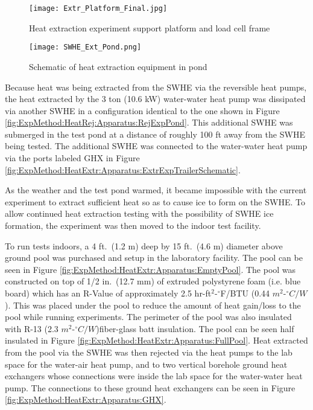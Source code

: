 	\begin{figure}
		\centering
		\texttt{[image: Extr\_Platform\_Final.jpg]}
		\caption[Final ice-on-coil platform]{Heat extraction experiment support platform and load cell frame}
		\label{fig:ExpMethod:HeatExtr:Apparatus:ExtrPlatformFinal}
	\end{figure}


	\begin{figure}
		\centering
		\texttt{[image: SWHE\_Ext\_Pond.png]}
		\caption[Schematic of heat extraction equipment in pond]{Schematic of heat extraction equipment in pond}
		\label{fig:ExpMethod:HeatExtr:Apparatus:ExtrExpPondSchematic}
	\end{figure}

Because heat was being extracted from the SWHE via the reversible heat pumps, the heat extracted by the 3 ton (10.6 kW) water-water heat pump was dissipated via another SWHE in a configuration identical to the one shown in Figure \ref{fig:ExpMethod:HeatRej:Apparatus:RejExpPond}. This additional SWHE was submerged in the test pond at a distance of roughly 100 ft away from the SWHE being tested. The additional SWHE was connected to the water-water heat pump via the ports labeled GHX in Figure \ref{fig:ExpMethod:HeatExtr:Apparatus:ExtrExpTrailerSchematic}.

As the weather and the test pond warmed, it became impossible with the current experiment to extract sufficient heat so as to cause ice to form on the SWHE. To allow continued heat extraction testing with the possibility of SWHE ice formation, the experiment was then moved to the indoor test facility.

To run tests indoors, a 4 ft.\ (1.2 m) deep by 15 ft.\ (4.6 m) diameter above ground pool was purchased and setup in the laboratory facility. The pool can be seen in Figure \ref{fig:ExpMethod:HeatExtr:Apparatus:EmptyPool}. The pool was constructed on top of 1/2 in.\ (12.7 mm) of extruded polystyrene foam (i.e. blue board) which has an R-Value of approximately 2.5 hr-ft$^2$-$^\circ$F/BTU (0.44 $m^2$-$^\circ C/W$). This was placed under the pool to reduce the amount of heat gain/loss to the pool while running experiments. The perimeter of the pool was also insulated with R-13 (2.3 $m^2$-$^\circ C/W$)fiber-glass batt insulation. The pool can be seen half insulated in Figure \ref{fig:ExpMethod:HeatExtr:Apparatus:FullPool}. Heat extracted from the pool via the SWHE was then rejected via the heat pumps to the lab space for the water-air heat pump, and to two vertical borehole ground heat exchangers whose connections were inside the lab space for the water-water heat pump. The connections to these ground heat exchangers can be seen in Figure \ref{fig:ExpMethod:HeatExtr:Apparatus:GHX}.

